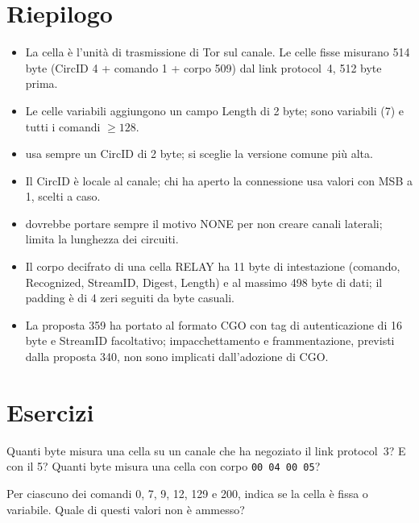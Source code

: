 \section*{Riepilogo}
\begin{itemize}
  \item La cella è l'unità di trasmissione di Tor sul canale. Le celle fisse misurano 514 byte (CircID 4 + comando 1 + corpo 509) dal link protocol~4, 512 byte prima.
  \item Le celle variabili aggiungono un campo Length di 2 byte; sono variabili  (7) e tutti i comandi $\ge 128$.
  \item {} usa sempre un CircID di 2 byte; si sceglie la versione comune più alta.
  \item Il CircID è locale al canale; chi ha aperto la connessione usa valori con MSB a 1, scelti a caso.
  \item {} dovrebbe portare sempre il motivo NONE per non creare canali laterali;  limita la lunghezza dei circuiti.
  \item Il corpo decifrato di una cella RELAY ha 11 byte di intestazione (comando, Recognized, StreamID, Digest, Length) e al massimo 498 byte di dati; il padding è di 4 zeri seguiti da byte casuali.
  \item La proposta 359 ha portato al formato CGO con tag di autenticazione di 16 byte e StreamID facoltativo; impacchettamento e frammentazione, previsti dalla proposta 340, non sono implicati dall'adozione di CGO.
\end{itemize}

\section*{Esercizi}

\begin{esercizio}[1]\label{es:08-lunghezze}
Quanti byte misura una cella  su un canale che ha negoziato il link protocol~3? E con il 5? Quanti byte misura una cella  con corpo \texttt{00 04 00 05}?
\end{esercizio}

\begin{esercizio}[1]\label{es:08-formato}
Per ciascuno dei comandi 0, 7, 9, 12, 129 e 200, indica se la cella è fissa o variabile. Quale di questi valori non è ammesso?
\end{esercizio}

